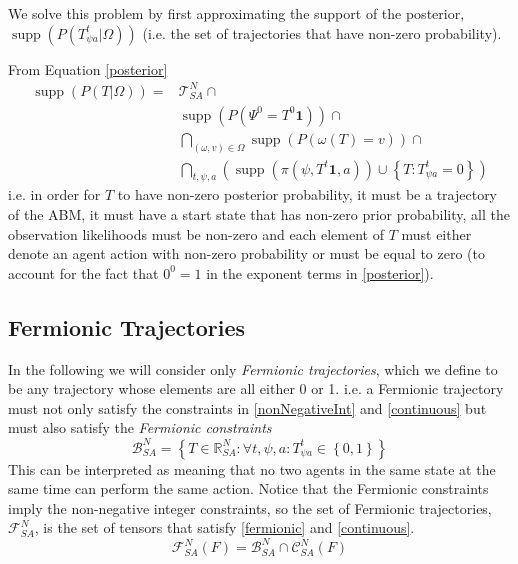 \documentclass{article}
\DeclareMathOperator\supp{supp}
\begin{document}
We solve this problem by first approximating the support of the posterior, $\supp(P(T^t_{\psi a}|\Omega))$ (i.e. the set of trajectories that have non-zero probability).

From Equation \eqref{posterior}
\begin{equation}
\begin{aligned}
\supp (P( T |\Omega)) = & \mathcal{T}^N_{SA} \cap \\ 
&\supp(P(\Psi^0 = T^0\mathbf{1})) \cap \\
&\bigcap_{(\omega,v) \in \Omega}  \supp\left(P\left(\omega(T)=v\right)\right) \cap \\
&\bigcap_{t, \psi, a} \left( \supp\left(\pi(\psi,T^t\mathbf{1},a)\right) \cup \left\{T:T^t_{\psi a} = 0\right\} \right)
\end{aligned}
\label{support}
\end{equation}
i.e. in order for $T$ to have non-zero posterior probability, it must be a trajectory of the ABM, it must have a start state that has non-zero prior probability, all the observation likelihoods must be non-zero and each element of $T$ must either denote an agent action with non-zero probability or must be equal to zero (to account for the fact that $0^0=1$ in the exponent terms in \eqref{posterior}).

\subsection{Fermionic Trajectories}

In the following we will consider only \textit{Fermionic trajectories}, which we define to be any trajectory whose elements are all either 0 or 1. i.e. a Fermionic trajectory must not only satisfy the constraints in \eqref{nonNegativeInt} and \eqref{continuous} but must also satisfy the \textit{Fermionic constraints}
\begin{equation}
\mathcal{B}^N_{SA} = \left\{T\in\mathbb{R}^N_{SA} : \forall t,\psi,a: T^t_{\psi a} \in \left\{ 0,1 \right\}\right\}
\label{fermionic}
\end{equation}
This can be interpreted as meaning that no two agents in the same state at the same time can perform the same action. Notice that the Fermionic constraints imply the non-negative integer constraints, so the set of Fermionic trajectories, $\mathcal{F}^N_{SA}$, is the set of tensors that satisfy \eqref{fermionic} and \eqref{continuous}.
\begin{equation}
\mathcal{F}^N_{SA}(F) = \mathcal{B}^N_{SA} \cap \mathcal{C}^N_{SA}(F)
\end{equation}
\end{document}
